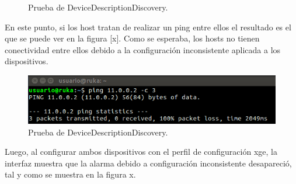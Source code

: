       \begin{figure}[H]
        \centering
        \caption{Prueba de DeviceDescriptionDiscovery.}
        \label{fig:test2}
      \end{figure}

      En este punto, si los host tratan de realizar un ping entre ellos el resultado es el que se puede ver en la figura [x]. Como se esperaba, los hosts no tienen conectividad entre ellos debido a la configuración inconsistente aplicada a los dispositivos.

      \begin{figure}[H]
        \centering
        \includegraphics[scale=0.7]{Figures/test9_2.png}
        \caption{Prueba de DeviceDescriptionDiscovery.}
        \label{fig:test2}
      \end{figure}

      Luego, al configurar ambos dispositivos con el perfil de configuración xge, la interfaz muestra que la alarma debido a configuración inconsistente desapareció, tal y como se muestra en la figura x.


